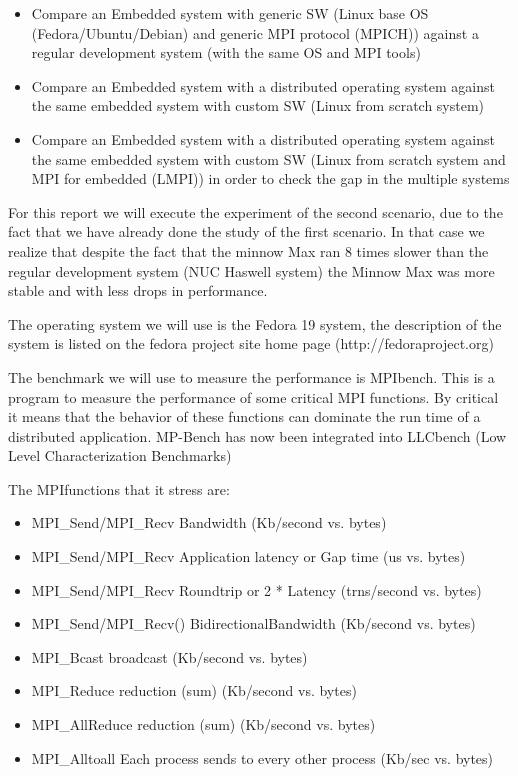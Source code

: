 \begin{itemize} 
    
    \item Compare an Embedded system with generic SW (Linux base OS
    (Fedora/Ubuntu/Debian) and generic MPI protocol (MPICH)) against a
    regular development system (with the same OS and MPI tools)

    \item Compare an Embedded system with a distributed operating system
    against the same embedded system with custom SW (Linux from scratch system)


    \item Compare an Embedded system with a distributed operating system
    against the same embedded system with custom SW (Linux from scratch system and
    MPI for embedded (LMPI)) in order to check the gap in the multiple systems

\end{itemize}

For this report we will execute the experiment of the second scenario, due to the
fact that we have already done the study of the first scenario. In that case we
realize that despite the fact that the minnow Max ran 8 times slower than the
regular development system (NUC Haswell system) the Minnow Max was more stable
and with less drops in performance. 

The operating system we will use is the Fedora 19 system, the description of the
system is listed on the fedora project site home page (http://fedoraproject.org)

The benchmark we will use to measure the performance is MPIbench. This is a
program to measure the performance of some critical MPI functions. By critical
it means that the behavior of these functions can dominate the run time of a
distributed application. MP-Bench has now been integrated into LLCbench (Low
Level Characterization Benchmarks) 

The MPIfunctions that it stress are: 


\begin{itemize}

\item MPI\_Send/MPI\_Recv Bandwidth (Kb/second vs. bytes) 
\item MPI\_Send/MPI\_Recv Application latency or Gap time (us vs. bytes)
\item MPI\_Send/MPI\_Recv Roundtrip or 2 * Latency (trns/second vs. bytes) 
\item MPI\_Send/MPI\_Recv() BidirectionalBandwidth (Kb/second vs. bytes) 
\item MPI\_Bcast broadcast (Kb/second vs. bytes) 
\item MPI\_Reduce reduction (sum) (Kb/second vs. bytes) 
\item MPI\_AllReduce reduction (sum) (Kb/second vs. bytes) 
\item MPI\_Alltoall Each process sends to every other process (Kb/sec vs. bytes) 

\end{itemize}



